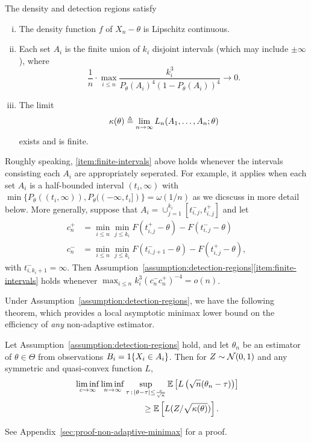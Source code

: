 \begin{assumption}
  \label{assumption:detection-regions}
  The density and detection regions satisfy
  \begin{enumerate}[(i)]
  \item \label{item:lipschitz-density}
    The density function $f$ of $X_n - \theta$ is Lipschitz continuous.
  \item \label{item:finite-intervals}
    Each set $A_i$ is the finite union of $k_i$ disjoint intervals
    (which may include $\pm \infty$), where
    \begin{equation*}
      \frac{1}{n} \cdot \max_{i \le n} \frac{k_i^3}{P_\theta(A_i)^4
        (1 - P_\theta(A_i))^4} \to 0.
    \end{equation*}
  \item \label{item:limit-variance}
    The limit
    \begin{equation}
      \label{eqn:LAN-limit}
      \kappa(\theta) \triangleq \lim_{n\to \infty} L_n(A_1,\ldots,A_n; \theta)
    \end{equation}
    exists and is finite.
  \end{enumerate}
\end{assumption}
Roughly speaking, \eqref{item:finite-intervals} above holds whenever the intervals consisting each $A_i$ are appropriately seperated. For example, it applies when each set $A_i$ is a half-bounded interval $(t_i,\infty)$ with $\min\{P_\theta((t_i,\infty)), P_\theta((-\infty,t_i])\} = \omega(1/n)$ as we dicscuss in more detail below. More generally, suppose that $A_i = \cup_{j=1}^{k_i}[t_{i,j}^-, t_{i,j}^+]$ and let 
\begin{align*}
c_n^+ & =  \min_{i \le n} \min_{j \leq k_i}  F(t^+_{i,j} - \theta) - F(t^-_{i,j}- \theta) \\
c_n^- & = \min_{i \le n} \min_{j \leq k_i}  F(t^-_{i,j+1}- \theta)  - F(t^+_{i,j}- \theta),
\end{align*}
with $t^-_{i,k_i+1} = \infty$. Then Assumption~\ref{assumption:detection-regions}\eqref{item:finite-intervals} holds whenever $\max_{i \le n} k_i^3 (c_n^- c_n^+)^{-4} = o(n)$. 

Under Assumption~\ref{assumption:detection-regions}, we have the following theorem, which provides
a local asymptotic minimax lower bound on the efficiency of
\emph{any} non-adaptive estimator.
\begin{theorem}
  \label{theorem:non-adaptive-minimax}
  Let Assumption~\ref{assumption:detection-regions} hold, and
  let ${\theta}_n$ be an estimator of $\theta \in \Theta$ from
  observations $B_i = 1\!\left\{X_i \in A_i\right\}$.
  Then for $Z \sim \mathcal{N}(0, 1)$ and any
  symmetric and quasi-convex function $L$,
  \begin{align*}
    & \liminf_{c \to \infty} \liminf_{n \to \infty}
    \sup_{\tau\,:\,|\theta-\tau| \leq \frac{c}{\sqrt{n} }}
    \mathbb{E} \left[ L\left( \sqrt{n}({\theta}_{n} - \tau) \right) \right] \\
    & \qquad \qquad \qquad \qquad \geq
    \mathbb{E}\left[ L (Z/\sqrt{\kappa(\theta)}) \right].
  \end{align*}
\end{theorem}
\noindent
See Appendix~\ref{sec:proof-non-adaptive-minimax} for a proof.

